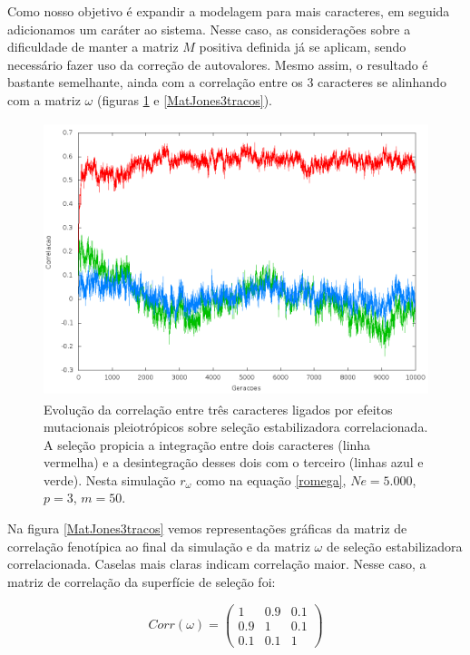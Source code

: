 Como nosso objetivo é expandir a modelagem para mais caracteres, em seguida
adicionamos um caráter ao sistema. 
Nesse caso, as considerações sobre a dificuldade de manter a matriz $M$
positiva definida já se aplicam, sendo necessário fazer uso da correção
de autovalores. 
Mesmo assim, o resultado é bastante semelhante, ainda com a correlação
entre os 3 caracteres se alinhando com a matriz $\omega$ (figuras
\ref{jones3tracos} e \ref{MatJones3tracos}). 


\begin{figure}[htbp]
  \centering
  \includegraphics[width=150mm, height=80mm]{figuras/jones3tracos.png}
  \caption{Evolução da correlação entre três caracteres ligados por efeitos
  mutacionais pleiotrópicos sobre seleção estabilizadora correlacionada.
  A seleção propicia a integração entre dois caracteres (linha vermelha) e a desintegração
  desses dois com o terceiro (linhas azul e verde). Nesta simulação
  $r_\omega$ como na equação \ref{romega}, $Ne=5.000$, $p=3$, $m=50$.}
  \label{jones3tracos}
\end{figure}


Na figura \ref{MatJones3tracos} vemos representações gráficas da matriz
de correlação fenotípica ao final da simulação e da matriz $\omega$ de
seleção estabilizadora correlacionada. 
Caselas mais claras indicam correlação maior. 
Nesse caso, a matriz de correlação da superfície de seleção foi:

\begin{equation}
Corr(\omega) = \left( \begin{smallmatrix} 1 & 0.9 & 0.1\\  0.9 & 1 & 0.1 \\ 0.1 & 0.1 & 1 \end{smallmatrix}  \right)
\label{romega}
\end{equation}


